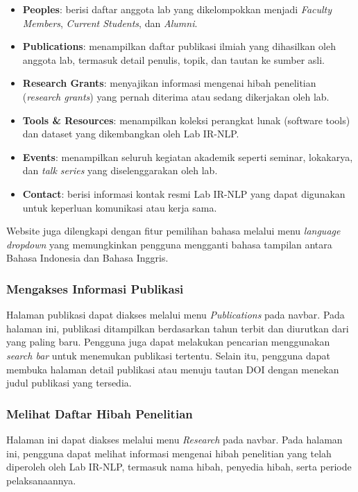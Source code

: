 \begin{itemize}
    \item \textbf{Peoples}: berisi daftar anggota lab yang dikelompokkan menjadi \textit{Faculty Members}, \textit{Current Students}, dan \textit{Alumni}.
    
    \item \textbf{Publications}: menampilkan daftar publikasi ilmiah yang dihasilkan oleh anggota lab, termasuk detail penulis, topik, dan tautan ke sumber asli.

    \item \textbf{Research Grants}: menyajikan informasi mengenai hibah penelitian (\textit{research grants}) yang pernah diterima atau sedang dikerjakan oleh lab.

    \item \textbf{Tools \& Resources}: menampilkan koleksi perangkat lunak (software tools) dan dataset yang dikembangkan oleh Lab IR-NLP.

    \item \textbf{Events}: menampilkan seluruh kegiatan akademik seperti seminar, lokakarya, dan \textit{talk series} yang diselenggarakan oleh lab.

    \item \textbf{Contact}: berisi informasi kontak resmi Lab IR-NLP yang dapat digunakan untuk keperluan komunikasi atau kerja sama.
\end{itemize}

Website juga dilengkapi dengan fitur pemilihan bahasa melalui menu \textit{language dropdown} yang memungkinkan pengguna mengganti bahasa tampilan antara Bahasa Indonesia dan Bahasa Inggris.

\subsubsection{Mengakses Informasi Publikasi}
Halaman publikasi dapat diakses melalui menu \textit{Publications} pada navbar. Pada halaman ini, publikasi ditampilkan berdasarkan tahun terbit dan diurutkan dari yang paling baru. Pengguna juga dapat melakukan pencarian menggunakan \textit{search bar} untuk menemukan publikasi tertentu. Selain itu, pengguna dapat membuka halaman detail publikasi atau menuju tautan DOI dengan menekan judul publikasi yang tersedia.

\subsubsection{Melihat Daftar Hibah Penelitian}
Halaman ini dapat diakses melalui menu \textit{Research} pada navbar. Pada halaman ini, pengguna dapat melihat informasi mengenai hibah penelitian yang telah diperoleh oleh Lab IR-NLP, termasuk nama hibah, penyedia hibah, serta periode pelaksanaannya.

